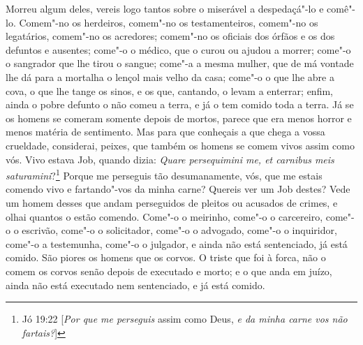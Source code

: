 Morreu algum deles, vereis logo tantos sobre o miserável a
despedaçá"-lo e comê"-lo. Comem"-no os herdeiros, comem"-no os
testamenteiros, comem"-no os legatários, comem"-no os acredores; comem"-no
os oficiais dos órfãos e os dos defuntos e ausentes; come"-o o médico,
que o curou ou ajudou a morrer; come"-o o sangrador que lhe tirou o
sangue; come"-a a mesma mulher, que de má vontade lhe dá para a mortalha
o lençol mais velho da casa; come"-o o que lhe abre a cova, o que lhe
tange os sinos, e os que, cantando, o levam a enterrar; enfim, ainda o
pobre defunto o não comeu a terra, e já o tem comido toda a terra.
Já se os homens se comeram somente depois de mortos, parece que era
menos horror e menos matéria de sentimento. Mas para que conheçais a que
chega a vossa crueldade, considerai, peixes, que também os homens se
comem vivos assim como vós. Vivo estava Job, quando dizia: \emph{Quare
persequimini me, et carnibus meis saturamini}?\footnote{Jó 19:22 [\emph{Por que me perseguis} assim como Deus, \emph{e da minha carne vos não fartais?}]} Porque me perseguis tão
desumanamente, vós, que me estais comendo vivo e fartando"-vos da minha
carne? Quereis ver um Job destes?
Vede um homem desses que andam perseguidos de pleitos ou acusados de
crimes, e olhai quantos o estão comendo. Come"-o o meirinho, come"-o o
carcereiro, come"-o o escrivão, come"-o o solicitador, come"-o o advogado,
come"-o o inquiridor, come"-o a testemunha, come"-o o julgador, e ainda não
está sentenciado, já está comido. São piores os homens que os corvos. O
triste que foi à forca, não o comem os corvos senão depois de executado
e morto; e o que anda em juízo, ainda não está executado nem
sentenciado, e já está comido.


